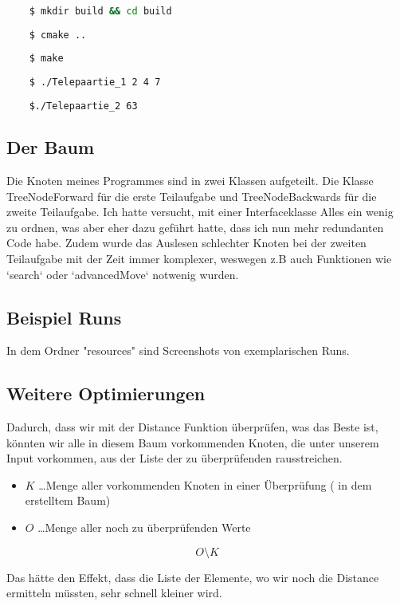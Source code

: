 \documentclass{article}
\begin{document}
\begin{lstlisting}[language=Bash]
	
	$ mkdir build && cd build
	
	$ cmake ..
	
	$ make
	
	$ ./Telepaartie_1 2 4 7
	
	$./Telepaartie_2 63

\end{lstlisting}

\subsection*{ Der Baum }

Die Knoten meines Programmes  sind in zwei Klassen aufgeteilt. Die Klasse TreeNodeForward für die erste Teilaufgabe und TreeNodeBackwards für die zweite Teilaufgabe. Ich hatte versucht, mit einer Interfaceklasse Alles ein wenig zu ordnen, was  aber eher dazu geführt hatte, dass ich nun mehr redundanten Code habe. Zudem wurde das Auslesen schlechter Knoten bei der zweiten Teilaufgabe mit der Zeit immer komplexer, weswegen  z.B auch Funktionen wie `search` oder `advancedMove` notwenig wurden.

\subsection*{ Beispiel Runs}

In dem Ordner "resources" sind Screenshots von exemplarischen Runs.

\subsection*{ Weitere Optimierungen}

Dadurch, dass  wir  mit der Distance Funktion überprüfen, was das Beste ist, könnten wir alle in diesem Baum vorkommenden Knoten, die unter unserem Input vorkommen, aus der Liste der zu überprüfenden rausstreichen. 

\newpage

\begin{itemize}
	\item \( K  \) \dots Menge aller vorkommenden Knoten in einer Überprüfung ( in dem erstelltem Baum)
	\item \( O \) \dots Menge aller noch zu überprüfenden Werte
\end{itemize}

\begin{equation}
	O \setminus K
\end{equation}

Das hätte den Effekt, dass die Liste der Elemente, wo wir noch die Distance ermitteln müssten, sehr schnell kleiner wird.
\end{document}
